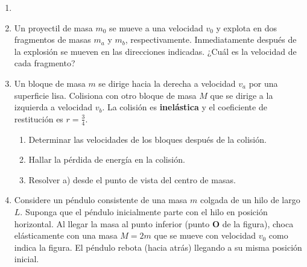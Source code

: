 \documentclass[letterpaper,11pt]{article}
\begin{document}
\vspace{-1cm}
\begin{enumerate}\setlength{\itemsep}{0.4cm}

\item[]

\item Un proyectil de masa $m_0$ se mueve a una velocidad $v_0$ y explota en dos fragmentos de masas $m_a$ y $m_b$, respectivamente. Inmediatamente después de la explosión se mueven en las direcciones indicadas. ¿Cuál es la velocidad de cada fragmento?

\begin{figure}[htbp]
  \centering
  
\end{figure}

\item Un bloque de masa $m$ se dirige hacia la derecha a velocidad $v_a$ por una superficie lisa. Colisiona con otro bloque de masa $M$ que se dirige a la izquierda a velocidad $v_b$. La colisión es \textbf{inelástica} y el coeficiente de restitución es $r = \frac{3}{4}$.

\begin{enumerate}
    \item Determinar las velocidades de los bloques después de la colisión.
    \item Hallar la pérdida de energía en la colisión.
    \item Resolver a) desde el punto de vista del centro de masas.
\end{enumerate}
\begin{figure}[H]
  \centering
  
\end{figure}

\item Considere un péndulo consistente de una masa $m$ colgada de un hilo de largo $L$. Suponga que el péndulo inicialmente parte con el hilo en posición horizontal. Al llegar la masa al punto inferior (punto \textbf{O} de la figura), choca elásticamente con una masa $M = 2m$ que se mueve con velocidad $v_0$ como indica la figura. El péndulo rebota (hacia atrás) llegando a su misma posición inicial.

\begin{figure}[htbp]
  \centering
  
\end{figure}


\end{enumerate}
\end{document}
